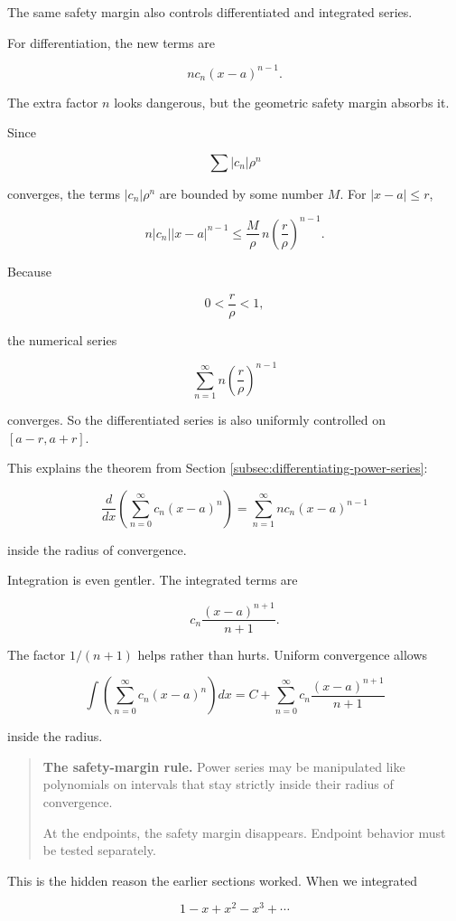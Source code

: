 The same safety margin also controls differentiated and integrated series.

For differentiation, the new terms are

\[
n c_n(x-a)^{n-1}.
\]

The extra factor \(n\) looks dangerous, but the geometric safety margin absorbs it.

Since

\[
\sum |c_n|\rho^n
\]

converges, the terms \(|c_n|\rho^n\) are bounded by some number \(M\).  For
\(|x-a|\le r\),

\[
n|c_n||x-a|^{n-1}
\le
\frac{M}{\rho}\, n\left(\frac{r}{\rho}\right)^{n-1}.
\]

Because

\[
0<\frac{r}{\rho}<1,
\]

the numerical series

\[
\sum_{n=1}^{\infty} n\left(\frac{r}{\rho}\right)^{n-1}
\]

converges.  So the differentiated series is also uniformly controlled on \([a-r,a+r]\).

This explains the theorem from Section \ref{subsec:differentiating-power-series}:

\[
\frac{d}{dx}\left(\sum_{n=0}^{\infty}c_n(x-a)^n\right)
=
\sum_{n=1}^{\infty}n c_n(x-a)^{n-1}
\]

inside the radius of convergence.

Integration is even gentler.  The integrated terms are

\[
c_n\frac{(x-a)^{n+1}}{n+1}.
\]

The factor \(1/(n+1)\) helps rather than hurts.  Uniform convergence allows

\[
\int \left(\sum_{n=0}^{\infty}c_n(x-a)^n\right)dx
=
C+\sum_{n=0}^{\infty}c_n\frac{(x-a)^{n+1}}{n+1}
\]

inside the radius.

\begin{quote}
\textbf{The safety-margin rule.}
Power series may be manipulated like polynomials on intervals that stay strictly inside
their radius of convergence.

At the endpoints, the safety margin disappears.  Endpoint behavior must be tested
separately.
\end{quote}

This is the hidden reason the earlier sections worked.  When we integrated

\[
1-x+x^2-x^3+\cdots
\]

